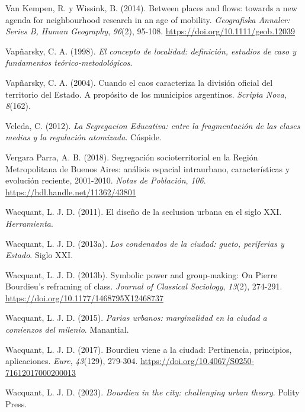 \documentclass[
  spanish,
  a4paper,%
  chapterprefix=true,%
  DIV=calc,%
  twoside]{scrbook}%
\newlength{\cslhangindent}
\newenvironment{CSLReferences}[2] %
 {\begin{list}{}{%
  \setlength{\itemindent}{0pt}
  \setlength{\leftmargin}{0pt}
  \setlength{\parsep}{0pt}
  \ifodd #1
   \setlength{\leftmargin}{\cslhangindent}
   \setlength{\itemindent}{-1\cslhangindent}
  \fi
  \setlength{\itemsep}{#2\baselineskip}}}
 {\end{list}}
\begin{document}
\begin{CSLReferences}{1}{0}
Van Kempen, R. y Wissink, B. (2014). Between places and flows: towards a new agenda for neighbourhood research in an age of mobility. \emph{Geografiska Annaler: Series B, Human Geography}, \emph{96}(2), 95-108. \url{https://doi.org/10.1111/geob.12039}

Vapñarsky, C. A. (1998). \emph{El concepto de localidad: definición, estudios de caso y fundamentos teórico-metodológicos}.

Vapñarsky, C. A. (2004). Cuando el caos caracteriza la división oficial del territorio del Estado. A propósito de los municipios argentinos. \emph{Scripta Nova}, \emph{8}(162).

Veleda, C. (2012). \emph{La Segregacion Educativa: entre la fragmentación de las clases medias y la regulación atomizada}. Cúspide.

Vergara Parra, A. B. (2018). Segregación socioterritorial en la Región Metropolitana de Buenos Aires: análisis espacial intraurbano, características y evolución reciente, 2001-2010. \emph{Notas de Población}, \emph{106}. \url{https://hdl.handle.net/11362/43801}

Wacquant, L. J. D. (2011). El diseño de la seclusion urbana en el siglo XXI. \emph{Herramienta}.

Wacquant, L. J. D. (2013a). \emph{Los condenados de la ciudad: gueto, periferias y Estado}. Siglo XXI.

Wacquant, L. J. D. (2013b). Symbolic power and group-making: On Pierre Bourdieu{'}s reframing of class. \emph{Journal of Classical Sociology}, \emph{13}(2), 274-291. \url{https://doi.org/10.1177/1468795X12468737}

Wacquant, L. J. D. (2015). \emph{Parias urbanos: marginalidad en la ciudad a comienzos del milenio}. Manantial.

Wacquant, L. J. D. (2017). Bourdieu viene a la ciudad: Pertinencia, principios, aplicaciones. \emph{Eure}, \emph{43}(129), 279-304. \url{https://doi.org/10.4067/S0250-71612017000200013}

Wacquant, L. J. D. (2023). \emph{Bourdieu in the city: challenging urban theory}. Polity Press.


\end{CSLReferences}
\end{document}
